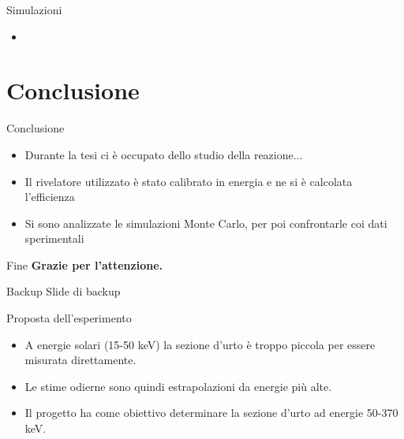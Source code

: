 \documentclass [xcolor=svgnames] {beamer}
\begin{document}
\begin{frame}{Simulazioni}
	\begin{itemize}
		\item %
	\end{itemize}
\end{frame}
	
	\section{Conclusione}
	\begin{frame}{Conclusione}
		\begin{itemize}
			\item<1-> Durante la tesi ci è occupato dello studio della reazione...
			\item<2-> Il rivelatore utilizzato è stato calibrato in energia e ne si è calcolata l'efficienza
			\item<3-> Si sono analizzate le simulazioni Monte Carlo, per poi confrontarle coi dati sperimentali
		\end{itemize}
	\end{frame}
	
	\begin{frame}{Fine}
		\centering
		\textbf{Grazie per l'attenzione.}
	\end{frame}
	
\begin{frame}{Backup}
	\centering
	Slide di backup
\end{frame}

\begin{frame}{Proposta dell'esperimento}
	\begin{itemize}
		\item<1-> A energie solari (15-50 keV) la sezione d'urto è troppo piccola per essere misurata direttamente.
		\item<2-> Le stime odierne sono quindi estrapolazioni da energie più alte.
		\item<3-> Il progetto ha come obiettivo determinare la sezione d'urto ad energie 50-370 keV.
	\end{itemize}
\end{frame}
\end{document}
